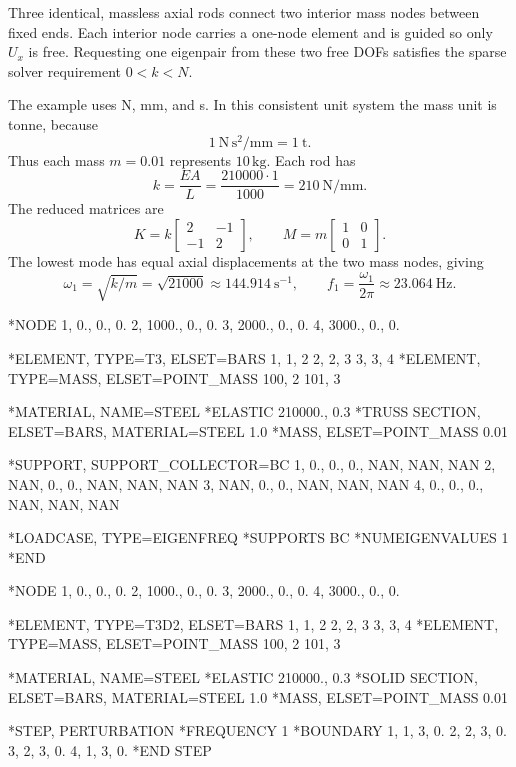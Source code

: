 Three identical, massless axial rods connect two interior mass nodes between fixed ends. Each interior node carries a one-node  element and is guided so only \(U_x\) is free. Requesting one eigenpair from these two free DOFs satisfies the sparse solver requirement \(0<k<N\).

The example uses N, mm, and s. In this consistent unit system the mass unit is tonne, because
\[
1\ \mathrm{N}\,\mathrm{s}^2/\mathrm{mm}=1\ \mathrm{t}.
\]
Thus each mass \(m=0.01\) represents \(10\,\mathrm{kg}\). Each rod has
\[
k=\frac{EA}{L}=\frac{210000\cdot1}{1000}=210\ \mathrm{N/mm}.
\]
The reduced matrices are
\[
K=k\begin{bmatrix}2&-1\\-1&2\end{bmatrix},\qquad
M=m\begin{bmatrix}1&0\\0&1\end{bmatrix}.
\]
The lowest mode has equal axial displacements at the two mass nodes, giving
\[
\omega_1=\sqrt{k/m}=\sqrt{21000}\approx144.914\ \mathrm{s}^{-1},
\qquad f_1=\frac{\omega_1}{2\pi}\approx23.064\ \mathrm{Hz}.
\]

\begin{dialectexamples}
\begin{femasterdeck}
*NODE
1,    0., 0., 0.
2, 1000., 0., 0.
3, 2000., 0., 0.
4, 3000., 0., 0.

*ELEMENT, TYPE=T3, ELSET=BARS
1, 1, 2
2, 2, 3
3, 3, 4
*ELEMENT, TYPE=MASS, ELSET=POINT_MASS
100, 2
101, 3

*MATERIAL, NAME=STEEL
*ELASTIC
210000., 0.3
*TRUSS SECTION, ELSET=BARS,
 MATERIAL=STEEL
1.0
*MASS, ELSET=POINT_MASS
0.01

*SUPPORT, SUPPORT_COLLECTOR=BC
1, 0., 0., 0., NAN, NAN, NAN
2, NAN, 0., 0., NAN, NAN, NAN
3, NAN, 0., 0., NAN, NAN, NAN
4, 0., 0., 0., NAN, NAN, NAN

*LOADCASE, TYPE=EIGENFREQ
*SUPPORTS
BC
*NUMEIGENVALUES
1
*END
\end{femasterdeck}
\begin{abaqusdeck}
*NODE
1,    0., 0., 0.
2, 1000., 0., 0.
3, 2000., 0., 0.
4, 3000., 0., 0.

*ELEMENT, TYPE=T3D2, ELSET=BARS
1, 1, 2
2, 2, 3
3, 3, 4
*ELEMENT, TYPE=MASS, ELSET=POINT_MASS
100, 2
101, 3

*MATERIAL, NAME=STEEL
*ELASTIC
210000., 0.3
*SOLID SECTION, ELSET=BARS,
 MATERIAL=STEEL
1.0
*MASS, ELSET=POINT_MASS
0.01

*STEP, PERTURBATION
*FREQUENCY
1
*BOUNDARY
1, 1, 3, 0.
2, 2, 3, 0.
3, 2, 3, 0.
4, 1, 3, 0.
*END STEP
\end{abaqusdeck}
\end{dialectexamples}

